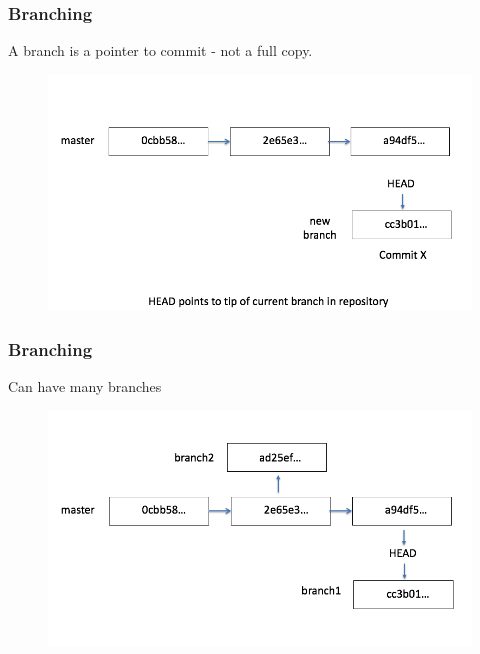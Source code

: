\documentclass[11pt]{beamer}
\begin{document}

\begin{frame}[fragile]
\frametitle{Branching}
A branch is a pointer to  commit - not a full copy.
\begin{figure}[htp]
 \centering
 \includegraphics[scale=0.35]{branch2.png}
\end{figure}




\end{frame}


\begin{frame}[fragile]
\frametitle{Branching}
Can have many branches
\begin{figure}[htp]
 \centering
 \includegraphics[scale=0.35]{branch3.png}
\end{figure}


\end{frame}
\end{document}
